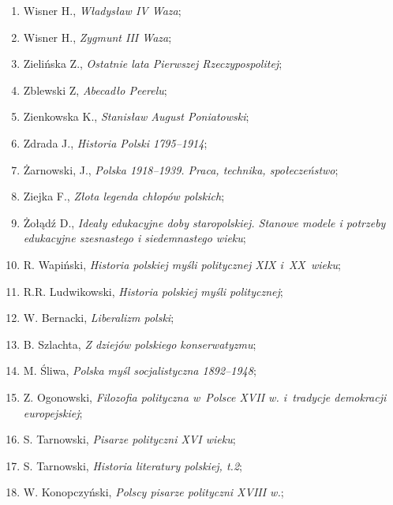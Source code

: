 \documentclass[a4paper,11pt]{article}
\begin{document}
\begin{enumerate}
\item Wisner H., \textit{Władysław IV Waza};

\item Wisner H., \textit{Zygmunt III Waza};

\item Zielińska Z., \textit{Ostatnie lata Pierwszej Rzeczypospolitej};

\item Zblewski Z, \textit{Abecadło Peerelu};

\item Zienkowska K., \textit{Stanisław August Poniatowski};

\item Zdrada J., \textit{Historia Polski 1795--1914};

\item Żarnowski, J., \textit{Polska 1918--1939. Praca, technika,
    społeczeństwo};

\item Ziejka F., \textit{Złota legenda chłopów polskich};

\item Żołądź D., \textit{Ideały edukacyjne doby staropolskiej. Stanowe
    modele i potrzeby edukacyjne szesnastego i siedemnastego wieku};

\item R. Wapiński, \textit{Historia polskiej myśli politycznej XIX
    i~XX~wieku};

\item R.R. Ludwikowski, \textit{Historia polskiej myśli politycznej};

\item W. Bernacki, \textit{Liberalizm polski};

\item B. Szlachta, \textit{Z dziejów polskiego konserwatyzmu};

\item M. Śliwa, \textit{Polska myśl socjalistyczna 1892--1948};

\item Z. Ogonowski, \textit{Filozofia polityczna w~Polsce XVII w.
    i~tradycje demokracji europejskiej};

\item S. Tarnowski, \textit{Pisarze polityczni XVI wieku};

\item S. Tarnowski, \textit{Historia literatury polskiej, t.2};

\item W. Konopczyński, \textit{Polscy pisarze polityczni XVIII w.};


\end{enumerate}
\end{document}
